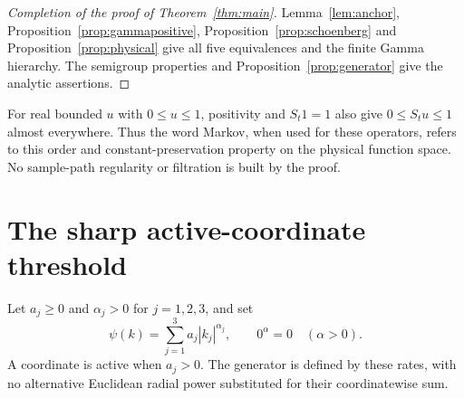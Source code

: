 \documentclass[11pt]{article}
\theoremstyle{remark}\newtheorem{remark}[theorem]{Remark}
\begin{document}
\begin{proof}[Completion of the proof of Theorem~\ref{thm:main}]
Lemma~\ref{lem:anchor}, Proposition~\ref{prop:gammapositive},
Proposition~\ref{prop:schoenberg} and
Proposition~\ref{prop:physical} give all five equivalences and
the finite Gamma hierarchy. The semigroup properties and
Proposition~\ref{prop:generator} give the analytic assertions.
\end{proof}

For real bounded $u$ with $0\leq u\leq1$, positivity and
$S_t1=1$ also give $0\leq S_tu\leq1$ almost everywhere. Thus the
word Markov, when used for these operators, refers to this order
and constant-preservation property on the physical function space.
No sample-path regularity or filtration is built by the proof.

\section{The sharp active-coordinate threshold}\label{sec:threshold}
Let $a_j\geq0$ and $\alpha_j>0$ for $j=1,2,3$, and set
\begin{equation}\label{eq:mixed}
 \psi(k)=\sum_{j=1}^3 a_j|k_j|^{\alpha_j},\qquad 0^\alpha=0
       \quad(\alpha>0).
\end{equation}
A coordinate is active when $a_j>0$. The generator is defined
by these rates, with no alternative Euclidean radial power
substituted for their coordinatewise sum.
\end{document}
